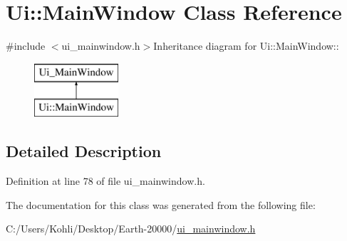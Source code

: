 \hypertarget{class_ui_1_1_main_window}{
\section{Ui::MainWindow Class Reference}
\label{class_ui_1_1_main_window}
}


{\ttfamily \#include $<$ui\_\-mainwindow.h$>$}Inheritance diagram for Ui::MainWindow::\begin{figure}[H]
\begin{center}
\leavevmode
\includegraphics[height=2cm]{class_ui_1_1_main_window}
\end{center}
\end{figure}


\subsection{Detailed Description}


Definition at line 78 of file ui\_\-mainwindow.h.

The documentation for this class was generated from the following file:\begin{DoxyCompactItemize}
\item 
C:/Users/Kohli/Desktop/Earth-\/20000/\hyperlink{ui__mainwindow_8h}{ui\_\-mainwindow.h}\end{DoxyCompactItemize}
